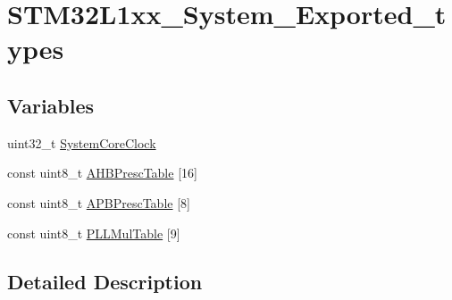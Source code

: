 \hypertarget{group___s_t_m32_l1xx___system___exported__types}{\section{S\-T\-M32\-L1xx\-\_\-\-System\-\_\-\-Exported\-\_\-types}
\label{group___s_t_m32_l1xx___system___exported__types}
}
\subsection*{Variables}
\begin{DoxyCompactItemize}
\item 
uint32\-\_\-t \hyperlink{group___s_t_m32_l1xx___system___exported__types_gaa3cd3e43291e81e795d642b79b6088e6}{System\-Core\-Clock}
\item 
const uint8\-\_\-t \hyperlink{group___s_t_m32_l1xx___system___exported__types_ga6e1d9cd666f0eacbfde31e9932a93466}{A\-H\-B\-Presc\-Table} \mbox{[}16\mbox{]}
\item 
const uint8\-\_\-t \hyperlink{group___s_t_m32_l1xx___system___exported__types_ga5b4f8b768465842cf854a8f993b375e9}{A\-P\-B\-Presc\-Table} \mbox{[}8\mbox{]}
\item 
const uint8\-\_\-t \hyperlink{group___s_t_m32_l1xx___system___exported__types_gadab2d89c9fe6053f421278d154dcfb9d}{P\-L\-L\-Mul\-Table} \mbox{[}9\mbox{]}
\end{DoxyCompactItemize}


\subsection{Detailed Description}


